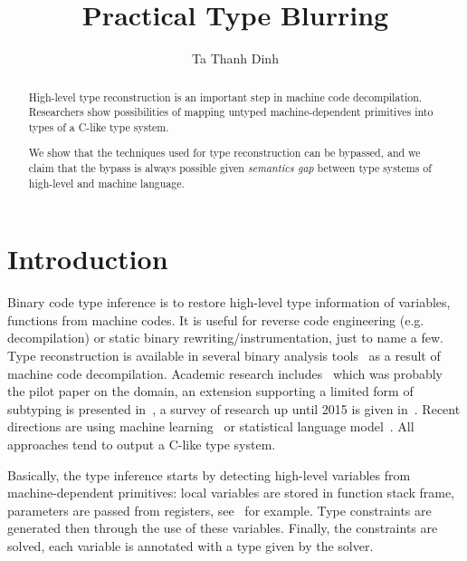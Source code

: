 \documentclass[a4paper]{llncs}
\begin{document}
%
\title{Practical Type Blurring}
%
%
\author{Ta Thanh Dinh}
%
%
%
\maketitle              %
%
\begin{abstract}
High-level type reconstruction is an important step in machine code decompilation.
Researchers show possibilities of mapping untyped machine-dependent
primitives into types of a C-like type system.


We show that the techniques used for type reconstruction can be bypassed,
and we claim that the bypass is always possible given \emph{semantics gap} between
type systems of high-level and machine language.
\end{abstract}
%
%
%
\section{Introduction}
Binary code type inference is to restore high-level type information of variables,
functions from machine codes. It is useful for reverse code engineering (e.g.
decompilation) or static binary rewriting/instrumentation, just to name a few.
Type reconstruction is available in several binary analysis
tools~\cite{noauthor_hex-rays_nodate, noauthor_jeb_nodate, noauthor_ghidra_nodate}
as a result of machine code decompilation. Academic research includes~\cite{mycroft_type-based_1999}
which was probably the pilot paper on the domain, an extension supporting
a limited form of subtyping is presented in~\cite{lee_tie_2011}, a survey of
research up until 2015 is given in~\cite{caballero_type_2016}. Recent
directions are using machine learning~\cite{maier_typeminer_2019} or statistical
language model~\cite{katz_estimating_2016}. All approaches tend to output a C-like type system.

Basically, the type inference starts by detecting high-level variables from
machine-dependent primitives: local variables are stored in function stack frame,
parameters are passed from registers, see~\cite{balakrishnan_wysinwyx_2007} for example.
Type constraints are generated then through the use of these variables. Finally,
the constraints are solved, each variable is annotated with a type given by the solver.
\end{document}
